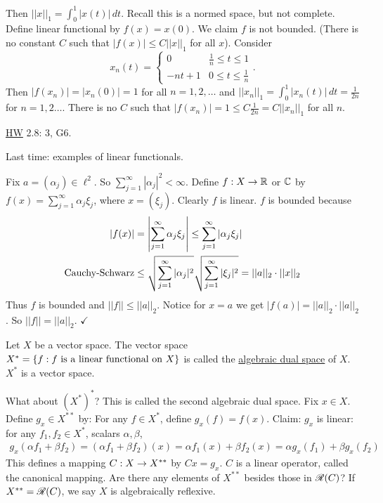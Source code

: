 \documentclass[]{article}
\begin{document}
\begin{example}
	[$X = C{[}0,1{]}$ with $||\cdot||_1$]
	Then $||x||_1 = \int_0^1|x(t)|\,dt$. Recall this is a normed space, but not complete.
	Define linear functional by $f(x) = x(0)$. We claim $f$ is not bounded.
	(There is no constant $C$ such that $|f(x)|\leq C||x||_1$ for all $x$).
	Consider $$x_n(t) = \begin{cases} 0 & \frac1n\leq t\leq 1 \\ -nt+1 & 0\leq t\leq\frac1n \end{cases}.$$
	Then $|f(x_n)| = |x_n(0)| = 1$ for all $n=1,2,\dots$ and $||x_n||_1 = \int_0^1|x_n(t)|\,dt = \frac1{2n}$ for $n=1,2\dots$.
	There is no $C$ such that $|f(x_n)|=1\leq C\frac1{2n} = C||x_n||_1$ for all $n$.
\end{example}
\ul{HW} 2.8: 3, G6.

\newpage
Last time: examples of linear functionals.

\begin{example}
	[$X=\ell^2$] Fix $a = (\alpha_j)\in\ell^2$.
	So $\sum_{j=1}^\infty |\alpha_j|^2<\infty$. Define $f:X\rightarrow\mathbb{R}$ or $\mathbb{C}$ by $f(x) = \sum_{j=1}^\infty \alpha_j\xi_j$, where $x=(\xi_j)$.
	Clearly $f$ is linear.
	$f$ is bounded because 
	\begin{align*}
		|f(x)| &= \left|\sum_{j=1}^\infty \alpha_j\xi_j\right|
			   \leq \sum_{j=1}^\infty |\alpha_j\xi_j| \\
		\text{Cauchy-Schwarz}	   &\leq \sqrt{\sum_{j=1}^\infty |\alpha_j|^2}\sqrt{\sum_{j=1}^\infty |\xi_j|^2} 
			   = ||a||_2\cdot ||x||_2
	\end{align*}
	Thus $f$ is bounded and $||f||\leq||a||_2$.
	Notice for $x=a$ we get $|f(a)| = ||a||_2\cdot ||a||_2$.
	So $||f||=||a||_2$. $\checkmark$
\end{example}

\begin{definition}
	Let $X$ be a vector space. The vector space $X^* = \left\{ f : f\text{ is a linear functional on }X \right\}$ is called the \ul{algebraic dual space} of $X$.
	$X^*$ is a vector space. 
\end{definition}
	What about $(X^*)^*$? This is called the second algebraic dual space.
Fix $x\in X$. Define $g_x\in X^{**}$ by:
For any $f\in X^*$, define $g_x(f) = f(x)$.
Claim: $g_x$ is linear: for any $f_1,f_2\in X^*$, scalars $\alpha,\beta$,
\begin{align*}
	g_x(\alpha f_1+\beta f_2) = (\alpha f_1+\beta f_2)(x) 
							  = \alpha f_1(x) + \beta f_2(x) 
							  = \alpha g_x(f_1) + \beta g_x(f_2)
\end{align*}
This defines a mapping $C:X\rightarrow X^{**}$ by $Cx = g_x$.
$C$ is a linear operator, called the canonical mapping.
Are there any elements of $X^{**}$ besides those in $\mathscr{R}(C)$?
If $X^{**} = \mathscr{R}(C)$, we say $X$ is algebraically reflexive.
\end{document}
